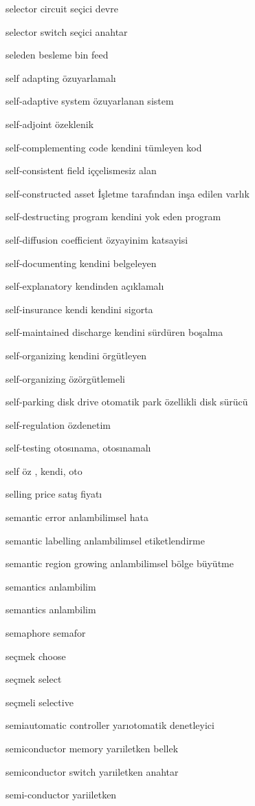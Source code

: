 \documentclass[12pt,fleqn]{article}\usepackage{../../common}
\begin{document}
selector circuit seçici devre

selector switch seçici anahtar

seleden besleme bin feed

self adapting özuyarlamalı

self-adaptive system özuyarlanan sistem

self-adjoint özeklenik

self-complementing code kendini tümleyen kod

self-consistent field iççelismesiz alan

self-constructed asset İşletme tarafından inşa edilen varlık

self-destructing program kendini yok eden program

self-diffusion coefficient özyayinim katsayisi

self-documenting kendini belgeleyen

self-explanatory kendinden açıklamalı

self-insurance kendi kendini sigorta

self-maintained discharge kendini sürdüren boşalma

self-organizing kendini örgütleyen

self-organizing özörgütlemeli

self-parking disk drive otomatik park özellikli disk sürücü

self-regulation özdenetim

self-testing otosınama, otosınamalı

self öz , kendi, oto

selling price satış fiyatı

semantic error anlambilimsel hata

semantic labelling anlambilimsel etiketlendirme

semantic region growing anlambilimsel bölge büyütme

semantics anlambilim

semantics anlambilim

semaphore semafor

seçmek choose

seçmek select

seçmeli selective

semiautomatic controller yarıotomatik denetleyici

semiconductor memory yarıiletken bellek

semiconductor switch yarıiletken anahtar

semi-conductor yariiletken
\end{document}
